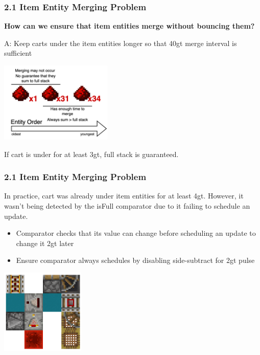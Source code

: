 \documentclass[aspectratio=169]{beamer}
\begin{document}
\begin{frame}
    \frametitle{2.1 Item Entity Merging Problem}
    \textbf{How can we ensure that item entities merge without bouncing them?}
    
    A: Keep carts under the item entities longer so that 40gt merge interval is sufficient

    \centering
    \includegraphics[width=0.4\textwidth]{mergelogic2.png}

    If cart is under for at least 3gt, full stack is guaranteed.
\end{frame}


\begin{frame}
    \frametitle{2.1 Item Entity Merging Problem}
    In practice, cart was already under item entities for at least 4gt. However, it wasn't being detected by the isFull comparator due to it failing to schedule an update.
    \begin{itemize}
        \item Comparator checks that its value can change before scheduling an update to change it 2gt later
        \item Ensure comparator always schedules by disabling side-subtract for 2gt pulse
    \end{itemize}

    \centering
    \includegraphics[width=0.3\textwidth]{comptrick.png}
\end{frame}
\end{document}

